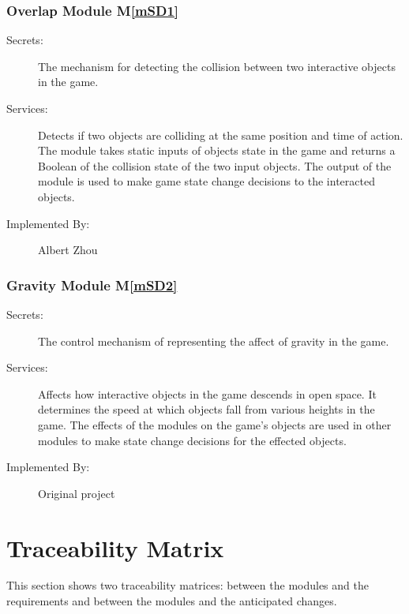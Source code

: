 \documentclass[12pt, titlepage]{article}
\newcommand{\mref}[1]{M\ref{#1}}
\begin{document}
\subsubsection{Overlap Module \mref{mSD1}}
\begin{description}
\item[Secrets:] The mechanism for detecting the collision between two interactive objects in the game. 
\item[Services:] Detects if two objects are colliding at the same position and time of action. The module takes static inputs of objects state in the game and returns a Boolean of the collision state of the two input objects. The output of the module is used to make game state change decisions to the interacted objects. 
\item[Implemented By:] Albert Zhou
\end{description}

\subsubsection{Gravity Module \mref{mSD2}}
\begin{description}
\item[Secrets:] The control mechanism of representing the affect of gravity in the game.
\item[Services:] Affects how interactive objects in the game descends in open space. It determines the speed at which objects fall from various heights in the game. The effects of the modules on the game's objects are used in other modules to make state change decisions for the effected objects.
\item[Implemented By:] Original project
\end{description}

\section{Traceability Matrix} \label{SecTM}

This section shows two traceability matrices: between the modules and the
requirements and between the modules and the anticipated changes.
\end{document}
